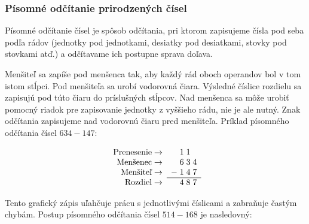 \documentclass{article}
\begin{document}
\subsubsection{Písomné odčítanie prirodzených čísel}

Písomné odčítanie čísel je spôsob odčítania, pri ktorom zapisujeme čísla pod seba podľa rádov (jednotky pod jednotkami, desiatky pod desiatkami, stovky pod stovkami atď.) a odčítavame ich postupne sprava doľava.

Menšiteľ sa zapíše pod menšenca tak, aby každý rád oboch operandov bol v tom istom stĺpci. Pod menšiteľa sa urobí vodorovná čiara. Výsledné číslice rozdielu sa zapisujú pod túto čiaru do príslušných stĺpcov. Nad menšenca sa môže urobiť pomocný riadok pre zapisovanie jednotky z vyššieho rádu, nie je ale nutný. Znak odčítania zapisujeme nad vodorovnú čiaru pred menšiteľa. Príklad písomného odčítania čísel \(634 - 147\):
\begin{table}[H]
  \centering
  \[
  \begin{array}{r}
    \text{Prenesenie} \rightarrow \\
    \text{Menšenec} \rightarrow \\
    \text{Menšiteľ} \rightarrow \\
    \text{Rozdiel} \rightarrow \\
  \end{array}
  \begin{array}{c@{\;}c@{\;}c@{\;}c}
      & 1 & 1 &  \\
      & 6 & 3 & 4 \\
    - & 1 & 4 & 7 \\
    \hline
      & 4 & 8 & 7
  \end{array}
  \]
\end{table}

Tento grafický zápis uľahčuje prácu s jednotlivými číslicami a zabraňuje častým chybám. Postup písomného odčítania čísel \(514 - 168\) je nasledovný:
\end{document}
